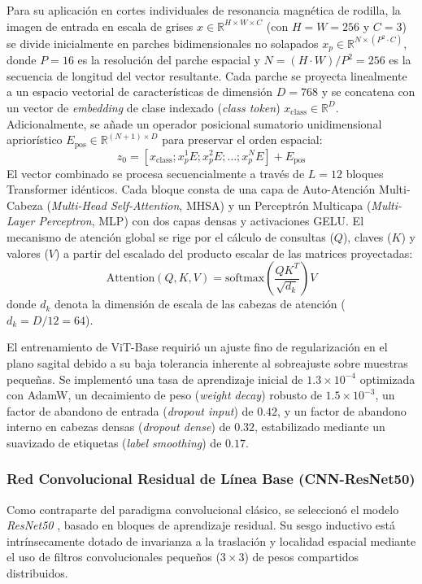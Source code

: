 Para su aplicación en cortes individuales de resonancia magnética de rodilla, la imagen de entrada en escala de grises $x \in \mathbb{R}^{H \times W \times C}$ (con $H=W=256$ y $C=3$) se divide inicialmente en parches bidimensionales no solapados $x_p \in \mathbb{R}^{N \times (P^2 \cdot C)}$, donde $P=16$ es la resolución del parche espacial y $N = (H \cdot W) / P^2 = 256$ es la secuencia de longitud del vector resultante. Cada parche se proyecta linealmente a un espacio vectorial de características de dimensión $D = 768$ y se concatena con un vector de \textit{embedding} de clase indexado (\textit{class token}) $x_{\text{class}} \in \mathbb{R}^{D}$. Adicionalmente, se añade un operador posicional sumatorio unidimensional apriorístico $E_{\text{pos}} \in \mathbb{R}^{(N+1) \times D}$ para preservar el orden espacial:
\begin{equation}
    z_0 = [x_{\text{class}}; x_p^1 E; x_p^2 E; \dots; x_p^N E] + E_{\text{pos}}
\end{equation}
El vector combinado se procesa secuencialmente a través de $L=12$ bloques Transformer idénticos. Cada bloque consta de una capa de Auto-Atención Multi-Cabeza (\textit{Multi-Head Self-Attention}, MHSA) y un Perceptrón Multicapa (\textit{Multi-Layer Perceptron}, MLP) con dos capas densas y activaciones GELU. El mecanismo de atención global se rige por el cálculo de consultas ($Q$), claves ($K$) y valores ($V$) a partir del escalado del producto escalar de las matrices proyectadas:
\begin{equation}
    \text{Attention}(Q, K, V) = \text{softmax}\left(\frac{Q K^T}{\sqrt{d_k}}\right) V
\end{equation}
donde $d_k$ denota la dimensión de escala de las cabezas de atención ($d_k = D / 12 = 64$). 

El entrenamiento de ViT-Base requirió un ajuste fino de regularización en el plano sagital debido a su baja tolerancia inherente al sobreajuste sobre muestras pequeñas. Se implementó una tasa de aprendizaje inicial de $1.3 \times 10^{-4}$ optimizada con AdamW, un decaimiento de peso (\textit{weight decay}) robusto de $1.5 \times 10^{-3}$, un factor de abandono de entrada (\textit{dropout input}) de $0.42$, y un factor de abandono interno en cabezas densas (\textit{dropout dense}) de $0.32$, estabilizado mediante un suavizado de etiquetas (\textit{label smoothing}) de $0.17$.

\subsubsection{Red Convolucional Residual de Línea Base (CNN-ResNet50)}
Como contraparte del paradigma convolucional clásico, se seleccionó el modelo \textit{ResNet50} \cite{he2016deep}, basado en bloques de aprendizaje residual. Su sesgo inductivo está intrínsecamente dotado de invarianza a la traslación y localidad espacial mediante el uso de filtros convolucionales pequeños ($3\times3$) de pesos compartidos distribuidos.

